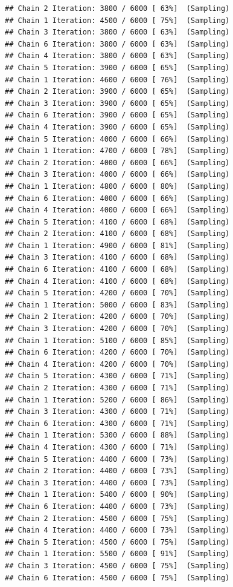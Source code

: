\documentclass[
]{article}
\begin{document}
\begin{verbatim}
## Chain 2 Iteration: 3800 / 6000 [ 63%]  (Sampling) 
## Chain 1 Iteration: 4500 / 6000 [ 75%]  (Sampling) 
## Chain 3 Iteration: 3800 / 6000 [ 63%]  (Sampling) 
## Chain 6 Iteration: 3800 / 6000 [ 63%]  (Sampling) 
## Chain 4 Iteration: 3800 / 6000 [ 63%]  (Sampling) 
## Chain 5 Iteration: 3900 / 6000 [ 65%]  (Sampling) 
## Chain 1 Iteration: 4600 / 6000 [ 76%]  (Sampling) 
## Chain 2 Iteration: 3900 / 6000 [ 65%]  (Sampling) 
## Chain 3 Iteration: 3900 / 6000 [ 65%]  (Sampling) 
## Chain 6 Iteration: 3900 / 6000 [ 65%]  (Sampling) 
## Chain 4 Iteration: 3900 / 6000 [ 65%]  (Sampling) 
## Chain 5 Iteration: 4000 / 6000 [ 66%]  (Sampling) 
## Chain 1 Iteration: 4700 / 6000 [ 78%]  (Sampling) 
## Chain 2 Iteration: 4000 / 6000 [ 66%]  (Sampling) 
## Chain 3 Iteration: 4000 / 6000 [ 66%]  (Sampling) 
## Chain 1 Iteration: 4800 / 6000 [ 80%]  (Sampling) 
## Chain 6 Iteration: 4000 / 6000 [ 66%]  (Sampling) 
## Chain 4 Iteration: 4000 / 6000 [ 66%]  (Sampling) 
## Chain 5 Iteration: 4100 / 6000 [ 68%]  (Sampling) 
## Chain 2 Iteration: 4100 / 6000 [ 68%]  (Sampling) 
## Chain 1 Iteration: 4900 / 6000 [ 81%]  (Sampling) 
## Chain 3 Iteration: 4100 / 6000 [ 68%]  (Sampling) 
## Chain 6 Iteration: 4100 / 6000 [ 68%]  (Sampling) 
## Chain 4 Iteration: 4100 / 6000 [ 68%]  (Sampling) 
## Chain 5 Iteration: 4200 / 6000 [ 70%]  (Sampling) 
## Chain 1 Iteration: 5000 / 6000 [ 83%]  (Sampling) 
## Chain 2 Iteration: 4200 / 6000 [ 70%]  (Sampling) 
## Chain 3 Iteration: 4200 / 6000 [ 70%]  (Sampling) 
## Chain 1 Iteration: 5100 / 6000 [ 85%]  (Sampling) 
## Chain 6 Iteration: 4200 / 6000 [ 70%]  (Sampling) 
## Chain 4 Iteration: 4200 / 6000 [ 70%]  (Sampling) 
## Chain 5 Iteration: 4300 / 6000 [ 71%]  (Sampling) 
## Chain 2 Iteration: 4300 / 6000 [ 71%]  (Sampling) 
## Chain 1 Iteration: 5200 / 6000 [ 86%]  (Sampling) 
## Chain 3 Iteration: 4300 / 6000 [ 71%]  (Sampling) 
## Chain 6 Iteration: 4300 / 6000 [ 71%]  (Sampling) 
## Chain 1 Iteration: 5300 / 6000 [ 88%]  (Sampling) 
## Chain 4 Iteration: 4300 / 6000 [ 71%]  (Sampling) 
## Chain 5 Iteration: 4400 / 6000 [ 73%]  (Sampling) 
## Chain 2 Iteration: 4400 / 6000 [ 73%]  (Sampling) 
## Chain 3 Iteration: 4400 / 6000 [ 73%]  (Sampling) 
## Chain 1 Iteration: 5400 / 6000 [ 90%]  (Sampling) 
## Chain 6 Iteration: 4400 / 6000 [ 73%]  (Sampling) 
## Chain 2 Iteration: 4500 / 6000 [ 75%]  (Sampling) 
## Chain 4 Iteration: 4400 / 6000 [ 73%]  (Sampling) 
## Chain 5 Iteration: 4500 / 6000 [ 75%]  (Sampling) 
## Chain 1 Iteration: 5500 / 6000 [ 91%]  (Sampling) 
## Chain 3 Iteration: 4500 / 6000 [ 75%]  (Sampling) 
## Chain 6 Iteration: 4500 / 6000 [ 75%]  (Sampling) 

\end{verbatim}
\end{document}

